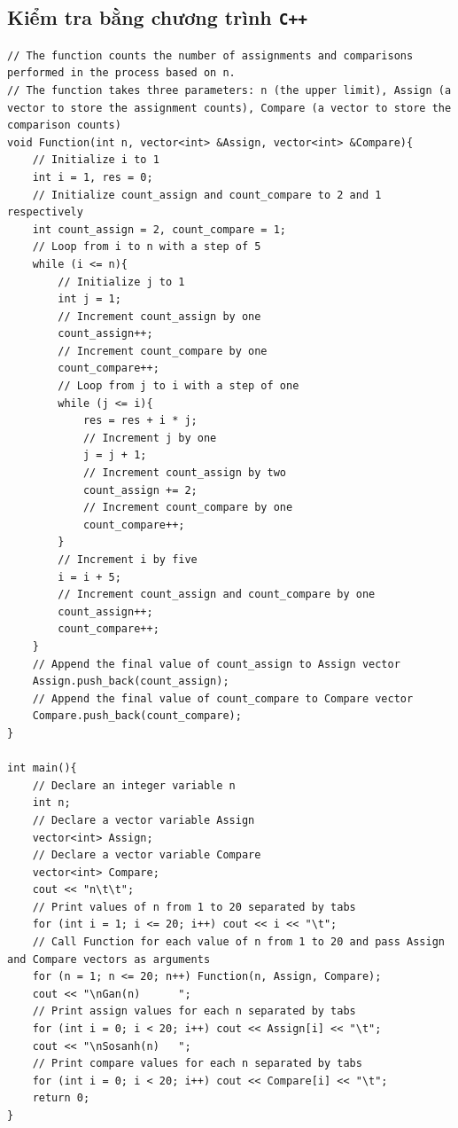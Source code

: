 \documentclass[12pt, a4paper]{article}
\begin{document}
\subsection{Kiểm tra bằng chương trình \texttt{C++}}
\begin{lstlisting}
// The function counts the number of assignments and comparisons performed in the process based on n.
// The function takes three parameters: n (the upper limit), Assign (a vector to store the assignment counts), Compare (a vector to store the comparison counts)
void Function(int n, vector<int> &Assign, vector<int> &Compare){
    // Initialize i to 1 
    int i = 1, res = 0; 
    // Initialize count_assign and count_compare to 2 and 1 respectively
    int count_assign = 2, count_compare = 1;
    // Loop from i to n with a step of 5
    while (i <= n){
        // Initialize j to 1
        int j = 1; 
        // Increment count_assign by one
        count_assign++;
        // Increment count_compare by one
        count_compare++;
        // Loop from j to i with a step of one
        while (j <= i){ 
            res = res + i * j;
            // Increment j by one
            j = j + 1;
            // Increment count_assign by two
            count_assign += 2;
            // Increment count_compare by one
            count_compare++; 
        }
        // Increment i by five
        i = i + 5;
        // Increment count_assign and count_compare by one
        count_assign++;  
        count_compare++;
    }
    // Append the final value of count_assign to Assign vector 
    Assign.push_back(count_assign);
    // Append the final value of count_compare to Compare vector
    Compare.push_back(count_compare);  
}

int main(){
    // Declare an integer variable n
    int n;
    // Declare a vector variable Assign
    vector<int> Assign;
    // Declare a vector variable Compare
    vector<int> Compare;  
    cout << "n\t\t";
    // Print values of n from 1 to 20 separated by tabs
    for (int i = 1; i <= 20; i++) cout << i << "\t";
    // Call Function for each value of n from 1 to 20 and pass Assign and Compare vectors as arguments
    for (n = 1; n <= 20; n++) Function(n, Assign, Compare);  
    cout << "\nGan(n)      ";
    // Print assign values for each n separated by tabs 
    for (int i = 0; i < 20; i++) cout << Assign[i] << "\t"; 
    cout << "\nSosanh(n)   ";
    // Print compare values for each n separated by tabs
    for (int i = 0; i < 20; i++) cout << Compare[i] << "\t"; 
    return 0;
}
\end{lstlisting}
\end{document}
